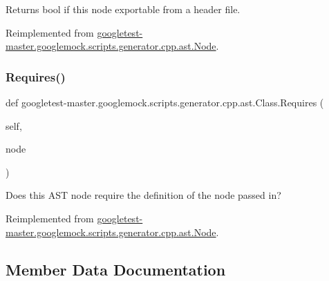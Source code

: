 \begin{DoxyVerb}Returns bool if this node exportable from a header file.\end{DoxyVerb}
 

Reimplemented from \mbox{\hyperlink{classgoogletest-master_1_1googlemock_1_1scripts_1_1generator_1_1cpp_1_1ast_1_1_node_a84e05fc36f3b1f650b0aad690ef91c3a}{googletest-\/master.\+googlemock.\+scripts.\+generator.\+cpp.\+ast.\+Node}}.

\mbox{\label{classgoogletest-master_1_1googlemock_1_1scripts_1_1generator_1_1cpp_1_1ast_1_1_class_a572f01c46482ba4dd42fec43cce8ec1a}} 
\subsubsection{\texorpdfstring{Requires()}{Requires()}}
{\footnotesize\ttfamily def googletest-\/master.\+googlemock.\+scripts.\+generator.\+cpp.\+ast.\+Class.\+Requires (\begin{DoxyParamCaption}\item[{}]{self,  }\item[{}]{node }\end{DoxyParamCaption})}

\begin{DoxyVerb}Does this AST node require the definition of the node passed in?\end{DoxyVerb}
 

Reimplemented from \mbox{\hyperlink{classgoogletest-master_1_1googlemock_1_1scripts_1_1generator_1_1cpp_1_1ast_1_1_node_a2e88d3bf96b19fe72c26eec93e104381}{googletest-\/master.\+googlemock.\+scripts.\+generator.\+cpp.\+ast.\+Node}}.



\subsection{Member Data Documentation}
\mbox{\label{classgoogletest-master_1_1googlemock_1_1scripts_1_1generator_1_1cpp_1_1ast_1_1_class_a80ca8b5a6f9978550f137cb10abb1de3}} 
